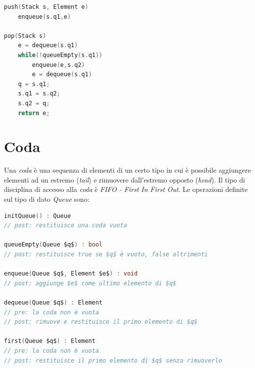 \documentclass[italian]{article}
\begin{document}
\begin{lstlisting}[language=c,mathescape=true]
push(Stack s, Element e)
	enqueue(s.q1,e)
	
pop(Stack s)
	e = dequeue(s.q1)
	while(!queueEmpty(s.q1))
		enqueue(e,s.q2)
		e = dequeue(s.q1)
	q = s.q1;
	s.q1 = s.q2;
	s.q2 = q;
	return e;
\end{lstlisting}

\section{Coda}
Una \textit{coda} è una sequenza di elementi di un certo tipo in cui è possibile aggiungere elementi ad un estremo (\textit{tail}) e rimuovere dall'estremo opposto (\textit{head}). Il tipo di disciplina di accesso alla \textit{coda} è \textit{FIFO - First In First Out}. Le operazioni definite sul tipo di dato \textit{Queue} sono:
\begin{lstlisting}[language=c,mathescape=true]
initQueue() : Queue
// post: restituisce una coda vuota

queueEmpty(Queue $q$) : bool
// post: restituisce true se $q$ è vuoto, false altrimenti

enqueue(Queue $q$, Element $e$) : void
// post: aggiunge $e$ come ultimo elemento di $q$

dequeue(Queue $q$) : Element
// pre: la coda non è vuota
// post: rimuove e restituisce il primo elemento di $q$

first(Queue $q$) : Element
// pre: la coda non è vuota
// post: restituisce il primo elemento di $q$ senza rimuoverlo
\end{lstlisting}
\pagebreak
\end{document}
